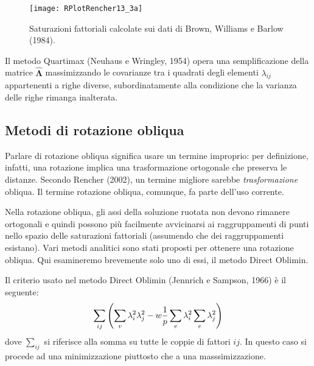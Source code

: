 \begin{figure}[h!]
 \centering
 \texttt{[image: RPlotRencher13\_3a]}
 \caption{Saturazioni fattoriali calcolate sui dati di Brown, Williams e Barlow (1984).}
  \label{fig:brown_varimax}
\end{figure}

Il metodo Quartimax (Neuhaus e Wringley, 1954) opera una semplificazione della matrice $\hat{\boldsymbol{\Lambda}}$ massimizzando le covarianze tra i quadrati degli elementi $\lambda_{ij}$ appartenenti a righe diverse, subordinatamente alla condizione che la varianza delle righe rimanga inalterata.

\subsection{Metodi di rotazione obliqua}

Parlare di rotazione obliqua significa usare un termine improprio: per definizione, infatti, una rotazione implica una trasformazione ortogonale che preserva le distanze. 
Secondo Rencher (2002), un termine migliore sarebbe \textit{trasformazione} obliqua. 
Il termine rotazione obliqua, comunque, fa parte dell'uso corrente.  

Nella rotazione obliqua, gli assi della soluzione ruotata non devono rimanere
ortogonali e quindi possono più facilmente avvicinarsi ai
raggruppamenti di punti nello spazio delle saturazioni fattoriali
(assumendo che dei raggruppamenti esistano). Vari metodi analitici sono
stati proposti per ottenere una rotazione obliqua.  Qui esamineremo
brevemente solo uno di essi, il metodo Direct Oblimin.

Il criterio usato nel metodo Direct Oblimin (Jennrich e Sampson, 1966)
è il seguente:
\begin{equation}
\sum_{ij} \left(\sum_v \lambda_i^2 \lambda_j^2 - w \frac{1}{p} \sum_v \lambda_i^2
\sum_v \lambda_j^2\right)\notag
\end{equation}
dove $\sum_{ij}$ si riferisce alla somma su tutte le coppie di fattori
$ij$. In questo caso si procede ad una minimizzazione piuttosto che a
una masssimizzazione.

